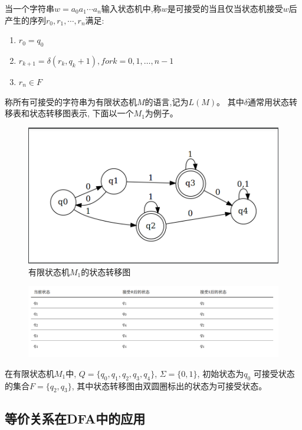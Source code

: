 \documentclass[UTF8]{ctexart}
\begin{document}
	当一个字符串$w = a_0a_1\cdots a_n$输入状态机中,称$w$是可接受的当且仅当状态机接受$w$后产生的序列$r_0, r_1, \cdots, r_n$满足:
	\begin{enumerate}
		\item \textbf{$r_0 = q_0$}
		\item \textbf{$r_{k+1} = \delta(r_k, q_k+1), for k = 0, 1, \ldots, n-1$}
		\item \textbf{$r_n \in F$}
	\end{enumerate}
	
	称所有可接受的字符串为有限状态机$M$的语言,记为$L(M)$。
	其中$\delta$通常用状态转移表和状态转移图表示, 下面以一个$M_1$为例子。\\
	\begin{figure}[h]
		\centering
		\includegraphics[scale=0.2]{../Img/dfa_example.png}
		\caption{有限状态机$M_1$的状态转移图}
	\end{figure}
	
	\begin{figure}[h]
		\centering
		\includegraphics[scale=0.3]{../Img/minimized_pic.png}
	\end{figure}
	在有限状态机$M_1$中, $Q=\{q_0, q_1,q_2,q_3,q_4\}$, $\Sigma = \{0,1\}$, 初始状态为$q_0$
	可接受状态的集合$F = \{q_2, q_3\}$, 其中状态转移图由双圆圈标出的状态为可接受状态。
	
	
	\subsection{等价关系在DFA中的应用}
	
\end{document}
